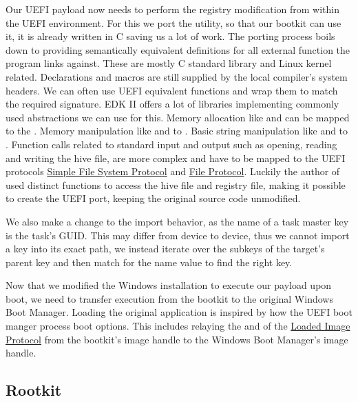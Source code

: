 Our \ac{UEFI} payload now needs to perform the registry modification from within the \ac{UEFI} environment.
For this we port the  utility, so that our bootkit can use it, it is already written in C saving us a lot of work.
The porting process boils down to providing semantically equivalent definitions for all external function the program links against.
These are mostly C standard library and Linux kernel related.
Declarations and macros are still supplied by the local compiler's system headers.
We can often use \ac{UEFI} equivalent functions and wrap them to match the required signature.
\ac{EDK} II offers a lot of libraries implementing commonly used abstractions we can use for this.
Memory allocation like  and  can be mapped to the .
Memory manipulation like  and  to .
Basic string manipulation like  and  to .
Function calls related to standard input and output such as opening, reading and writing the hive file, are more complex and have to be mapped to the \ac{UEFI} protocols \hyperref[lst:simple-file-system-protocol]{Simple File System Protocol} and \hyperref[lst:simple-file-system-protocol]{File Protocol}.
Luckily the author of  used distinct functions to access the hive file and registry file, making it possible to create the \ac{UEFI} port, keeping the original source code unmodified.

We also make a change to the import behavior, as the name of a task master key is the task's \ac{GUID}.
This may differ from device to device, thus we cannot import a key into its exact path, we instead iterate over the subkeys of the target's parent key and then match for the name value to find the right key.

Now that we modified the Windows installation to execute our payload upon boot, we need to transfer execution from the bootkit to the original Windows Boot Manager.
Loading the original application is inspired by how the \ac{UEFI} boot manger process boot options.
This includes relaying the  and  of the \hyperref[lst:loaded-image-protocol]{Loaded Image Protocol} from the bootkit's image handle to the Windows Boot Manager's image handle.

\subsection{Rootkit}

